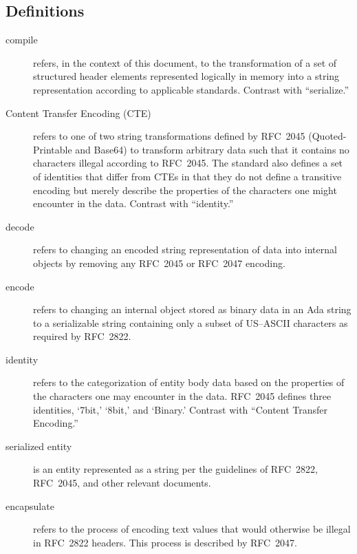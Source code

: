 \documentclass[11pt]{article}
\begin{document}

\subsection{Definitions}
\label{definitions}

\begin{description}

\item[compile] refers, in the context of this document, to the
  transformation of a set of structured header elements represented
  logically in memory into a string representation according to
  applicable standards. Contrast with ``serialize.''

\item[Content Transfer Encoding (CTE)] refers to one of two string
  transformations defined by RFC~2045 (Quoted-Printable and Base64) to
  transform arbitrary data such that it contains no characters illegal
  according to RFC~2045. The standard also defines a set of identities
  that differ from CTEs in that they do not define a transitive
  encoding but merely describe the properties of the characters one
  might encounter in the data. Contrast with ``identity.''

\item[decode] refers to changing an encoded string representation of
  data into internal objects by removing any RFC~2045 or RFC~2047
  encoding.

\item[encode] refers to changing an internal object stored as binary
  data in an Ada string to a serializable string containing only a
  subset of US--ASCII characters as required by RFC~2822.

\item[identity] refers to the categorization of entity body data based
  on the properties of the characters one may encounter in the
  data. RFC~2045 defines three identities, `7bit,' `8bit,' and
  `Binary.' Contrast with ``Content Transfer Encoding.''

\item[serialized entity] is an entity represented as a string per the
  guidelines of RFC~2822, RFC~2045, and other relevant documents. 

\item[encapsulate] refers to the process of encoding text values that
  would otherwise be illegal in RFC~2822 headers. This process is
  described by RFC~2047.


\end{description}
\end{document}
